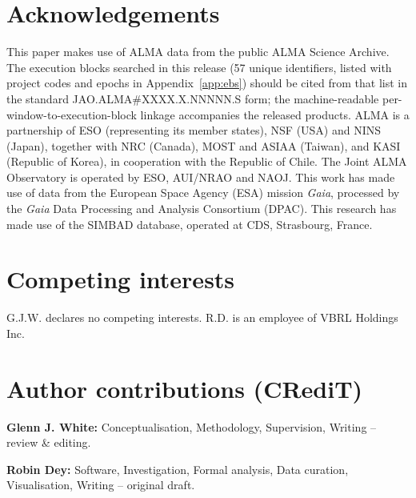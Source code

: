 \documentclass{openjournal}
\begin{document}
\section*{Acknowledgements}
This paper makes use of ALMA data from the public ALMA Science
Archive. The execution blocks searched in this release (57 unique
identifiers, listed with project codes and epochs in
Appendix~\ref{app:ebs}) should be cited from that list in the
standard JAO.ALMA\#XXXX.X.NNNNN.S form; the machine-readable
per-window-to-execution-block linkage accompanies the released
products.
ALMA is a partnership of ESO
(representing its member states), NSF (USA) and NINS (Japan), together with NRC
(Canada), MOST and ASIAA (Taiwan), and KASI (Republic of Korea), in cooperation
with the Republic of Chile. The Joint ALMA Observatory is operated by ESO,
AUI/NRAO and NAOJ. This work has made use of data from the European Space
Agency (ESA) mission {\it Gaia}, processed by the {\it Gaia} Data Processing and
Analysis Consortium (DPAC). This research has made use of the SIMBAD
database, operated at CDS, Strasbourg, France.

\section*{Competing interests}
G.J.W. declares no competing interests. R.D. is an employee of VBRL
Holdings Inc. %

\section*{Author contributions (CRediT)}
\textbf{Glenn J. White:} Conceptualisation, Methodology, Supervision,
Writing -- review \& editing.

\textbf{Robin Dey:} Software, Investigation, Formal analysis, Data
curation, Visualisation, Writing -- original draft.
\end{document}
